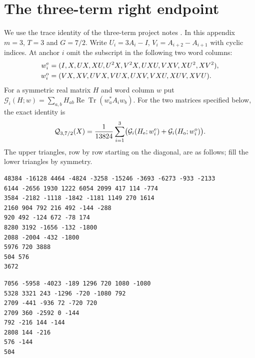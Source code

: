 \documentclass[11pt]{article}
\newcommand{\Tr}{\operatorname{Tr}}
\begin{document}
\section{The three-term right endpoint}\label{app:three}

We use the trace identity of the three-term project notes
\cite{round8}. In this appendix \(m=3\), \(T=3\) and \(G=7/2\).
Write \(U_i=3A_i-I\), \(V_i=A_{i+2}-A_{i+1}\) with cyclic
indices. At anchor \(i\) omit the subscript in the following
two word columns:
\[
\begin{split}
w_i^{\rm e}&=(I,X,UX,XU,U^2X,V^2X,UXU,VXV,XU^2,XV^2),\\
w_i^{\rm o}&=(VX,XV,UVX,VUX,UXV,VXU,XUV,XVU).
\end{split}
\]
For a symmetric real matrix \(H\) and word column \(w\) put
\(\mathcal G_i(H;w)=\sum_{a,b}H_{ab}\operatorname{Re}\Tr(w_a^*A_iw_b)\).
For the two matrices specified below, the exact identity is
\begin{equation}\label{eq:three}
\mathcal Q_{3,7/2}(X)=\frac1{13824}
  \sum_{i=1}^3\bigl(\mathcal G_i(H_{\rm e};w_i^{\rm e})
                  +\mathcal G_i(H_{\rm o};w_i^{\rm o})\bigr).
\end{equation}
The upper triangles, row by row starting on the diagonal,
are as follows; fill the lower triangles by symmetry.
\begin{verbatim}
48384 -16128 4464 -4824 -3258 -15246 -3693 -6273 -933 -2133
6144 -2656 1930 1222 6054 2099 417 114 -774
3584 -2182 -1118 -1842 -1181 1149 270 1614
2160 904 792 216 492 -144 -288
920 492 -124 672 -78 174
8280 3192 -1656 -132 -1800
2088 -2004 -432 -1800
5976 720 3888
504 576
3672
\end{verbatim}
\begin{verbatim}
7056 -5958 -4023 -189 1296 720 1080 -1080
5328 3321 243 -1296 -720 -1080 792
2709 -441 -936 72 -720 720
2709 360 -2592 0 -144
792 -216 144 -144
2808 144 -216
576 -144
504
\end{verbatim}
\end{document}
